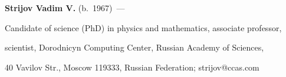 \noindent

\textbf{Strijov Vadim V.} (b.\ 1967)~---

Candidate of science (PhD) in physics and mathematics, associate professor,

scientist, Dorodnicyn Computing Center, Russian Academy of Sciences,

40 Vavilov Str., Moscow 119333, Russian Federation;   strijov@ccas.com



 \label{end\stat}



\renewcommand{\bibname}{\protect\rm Литература}